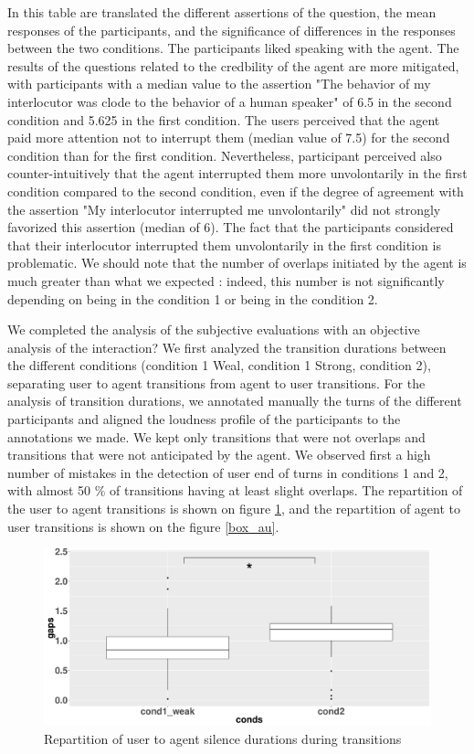 In this table are translated the different assertions of the question, the mean responses of the participants, and the significance of differences in the responses between the two conditions. The participants liked speaking with the agent. The results of the questions related to the credbility of the agent are more mitigated, with participants with a median value to the assertion "The behavior of my interlocutor was clode to the behavior of a human speaker" of 6.5 in the second condition and 5.625 in the first condition. The users perceived that the agent paid more attention not to interrupt them (median value of 7.5) for the second condition than for the first condition. Nevertheless, participant perceived also counter-intuitively that the agent interrupted them more unvolontarily in the first condition compared to the second condition, even if the degree of agreement with the assertion "My interlocutor interrupted me unvolontarily" did not strongly favorized this assertion (median of 6). The fact that the participants considered that their interlocutor interrupted them unvolontarily in the first condition is problematic. We should note that the number of overlaps initiated by the agent is much greater than what we expected : indeed, this number is not significantly depending on being in the condition 1 or being in the condition 2.

We completed the analysis of the subjective evaluations with an objective analysis of the interaction? We first analyzed the transition durations between the different conditions (condition 1 Weal, condition 1 Strong, condition 2), separating user to agent transitions from agent to user transitions. For the analysis of transition durations, we annotated manually the turns of the different participants and aligned the loudness profile of the participants to the annotations we made. We kept only transitions that were not overlaps and transitions that were not anticipated by the agent. We observed first a high number of mistakes in the detection of user end of turns in conditions 1 and 2, with almost 50 \% of transitions having at least slight overlaps.  The repartition of the user to agent transitions is shown on figure \ref{box_ua}, and the repartition of agent to user transitions is shown on the figure \ref{box_au}. 

\begin{figure}
\centering
\includegraphics[width=\linewidth]{figure/boxTransitionsUA.pdf}
\caption{Repartition of user to agent silence durations during transitions}
\label{box_ua}
\end{figure}

